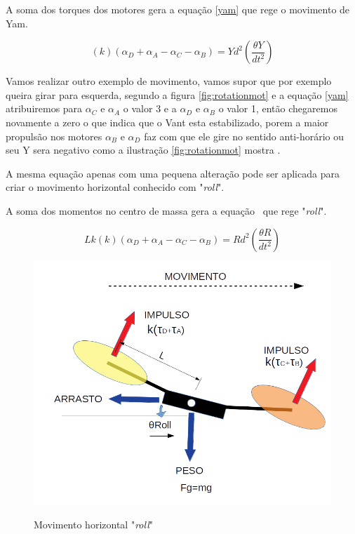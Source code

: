A soma dos torques dos motores gera a equação \ref{yam} que rege o movimento de Yam. 

\begin{equation}
    \label{yam}
    \left(k\right)\left(\alpha_{D}+\alpha_{A}-\alpha_{C}-\alpha_{B}\right)=Yd^2\left(\frac{\theta Y}{dt^2}\right)
\end{equation}

Vamos realizar outro exemplo de movimento, vamos supor que por exemplo queira girar para esquerda, segundo a figura \ref{fig:rotationmot} e a equação \ref{yam} atribuiremos para $\alpha_{C}$ e $\alpha_{A}$ o valor 3 e a $\alpha_{D}$ e $\alpha_{B}$ o valor 1, então chegaremos novamente a zero o que indica que o Vant esta estabilizado, porem a maior propulsão nos motores $\alpha_{B}$ e $\alpha_{D}$ faz com que ele gire no sentido anti-horário ou seu Y sera negativo como a ilustração \ref{fig:rotationmot} mostra \cite{momesf}.

A mesma equação apenas com uma pequena alteração pode ser aplicada para criar o movimento horizontal conhecido com "\textit{roll}". 

A soma dos momentos no centro de massa gera a equação \ que rege "\textit{roll}". 

\begin{equation}
    \label{roll}
    Lk\left(k\right)\left(\alpha_{D}+\alpha_{A}-\alpha_{C}-\alpha_{B}\right)=Rd^2\left(\frac{\theta R}{dt^2}\right)
\end{equation}

\begin{figure}[htb]
  \centering
  \caption{Movimento horizontal "\textit{roll}"}
  \includegraphics[scale=.3]{figs/dirdrone.png}
  \label{fig:roll}
\end{figure}

